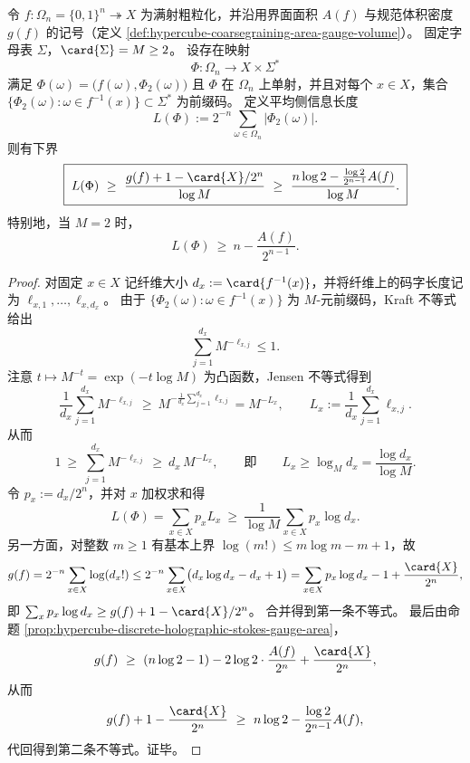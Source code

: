 \begin{theorem}\label{thm:hypercube-kraft-godel-sideinfo-lower-bound}
令 \(f:\Omega_n=\{0,1\}^n\twoheadrightarrow X\) 为满射粗粒化，并沿用界面面积 \(A(f)\) 与规范体积密度 \(g(f)\) 的记号（定义 \ref{def:hypercube-coarsegraining-area-gauge-volume}）。
固定字母表 \(\Sigma\)，\(\card{\Sigma}=M\ge 2\)。
设存在映射
\[
\Phi:\Omega_n\longrightarrow X\times \Sigma^\ast
\]
满足 \(\Phi(\omega)=\bigl(f(\omega),\Phi_2(\omega)\bigr)\) 且 \(\Phi\) 在 \(\Omega_n\) 上单射，并且对每个 \(x\in X\)，集合 \(\{\Phi_2(\omega):\omega\in f^{-1}(x)\}\subset \Sigma^\ast\) 为前缀码。
定义平均侧信息长度
\[
L(\Phi):=2^{-n}\sum_{\omega\in\Omega_n}\bigl|\Phi_2(\omega)\bigr|.
\]
则有下界
\[
\boxed{\;
L(\Phi)\ \ge\ \frac{g(f)+1-\card{X}/2^n}{\log M}
\ \ge\ \frac{n\log 2-\frac{\log 2}{2^{n-1}}A(f)}{\log M}.\;}
\]
特别地，当 \(M=2\) 时，
\[
L(\Phi)\ \ge\ n-\frac{A(f)}{2^{n-1}}.
\]
\end{theorem}
\begin{proof}
对固定 \(x\in X\) 记纤维大小 \(d_x:=\card{f^{-1}(x)}\)，并将纤维上的码字长度记为 \(\ell_{x,1},\dots,\ell_{x,d_x}\)。
由于 \(\{\Phi_2(\omega):\omega\in f^{-1}(x)\}\) 为 \(M\)-元前缀码，Kraft 不等式给出
\[
\sum_{j=1}^{d_x}M^{-\ell_{x,j}}\le 1.
\]
注意 \(t\mapsto M^{-t}=\exp(-t\log M)\) 为凸函数，Jensen 不等式得到
\[
\frac1{d_x}\sum_{j=1}^{d_x}M^{-\ell_{x,j}}
\ \ge\
M^{-\frac1{d_x}\sum_{j=1}^{d_x}\ell_{x,j}}
=M^{-L_x},
\qquad
L_x:=\frac1{d_x}\sum_{j=1}^{d_x}\ell_{x,j}.
\]
从而
\[
1\ \ge\ \sum_{j=1}^{d_x}M^{-\ell_{x,j}}\ \ge\ d_x\,M^{-L_x},
\qquad\text{即}\qquad
L_x\ge \log_M d_x=\frac{\log d_x}{\log M}.
\]
令 \(p_x:=d_x/2^n\)，并对 \(x\) 加权求和得
\[
L(\Phi)=\sum_{x\in X}p_x L_x\ \ge\ \frac{1}{\log M}\sum_{x\in X}p_x\log d_x.
\]
另一方面，对整数 \(m\ge 1\) 有基本上界 \(\log(m!)\le m\log m-m+1\)，故
\[
g(f)=2^{-n}\sum_{x\in X}\log(d_x!)
\le
2^{-n}\sum_{x\in X}\bigl(d_x\log d_x-d_x+1\bigr)
=\sum_{x\in X}p_x\log d_x-1+\frac{\card{X}}{2^n},
\]
即 \(\sum_x p_x\log d_x\ge g(f)+1-\card{X}/2^n\)。
合并得到第一条不等式。
最后由命题 \ref{prop:hypercube-discrete-holographic-stokes-gauge-area}，
\[
g(f)\ \ge\ (n\log 2-1)-2\log 2\cdot\frac{A(f)}{2^n}+\frac{\card{X}}{2^n},
\]
从而
\[
g(f)+1-\frac{\card{X}}{2^n}\ \ge\ n\log 2-\frac{\log 2}{2^{n-1}}A(f),
\]
代回得到第二条不等式。证毕。
\end{proof}

\endinput
